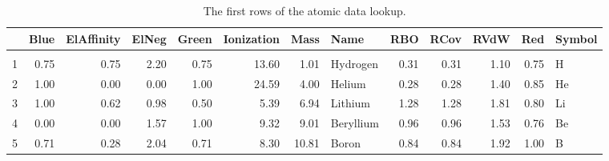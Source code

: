 \documentclass[10pt,parskip=half,
	toc=sectionentrywithdots,
	bibliography=totocnumbered,
	captions=tableheading,numbers=noendperiod]{scrartcl}
\begin{document}
    \begin{table}[H]\caption{The first rows of the atomic data lookup.}

        \centering
		\begin{adjustbox}{max width=\textwidth}
        \begin{tabular}{lrrrrrrlrrrrl}
\toprule
{} &  Blue &  ElAffinity &  ElNeg &  Green &  Ionization &   Mass &       Name &   RBO &  RCov &  RVdW &   Red & Symbol \\
\midrule
  &       &             &        &        &             &        &            &       &       &       &       &        \\
1 &  0.75 &        0.75 &   2.20 &   0.75 &       13.60 &   1.01 &   Hydrogen &  0.31 &  0.31 &  1.10 &  0.75 &      H \\
2 &  1.00 &        0.00 &   0.00 &   1.00 &       24.59 &   4.00 &     Helium &  0.28 &  0.28 &  1.40 &  0.85 &     He \\
3 &  1.00 &        0.62 &   0.98 &   0.50 &        5.39 &   6.94 &    Lithium &  1.28 &  1.28 &  1.81 &  0.80 &     Li \\
4 &  0.00 &        0.00 &   1.57 &   1.00 &        9.32 &   9.01 &  Beryllium &  0.96 &  0.96 &  1.53 &  0.76 &     Be \\
5 &  0.71 &        0.28 &   2.04 &   0.71 &        8.30 &  10.81 &      Boron &  0.84 &  0.84 &  1.92 &  1.00 &      B \\
\bottomrule
\end{tabular}

		\end{adjustbox}
        \end{table}
\end{document}
